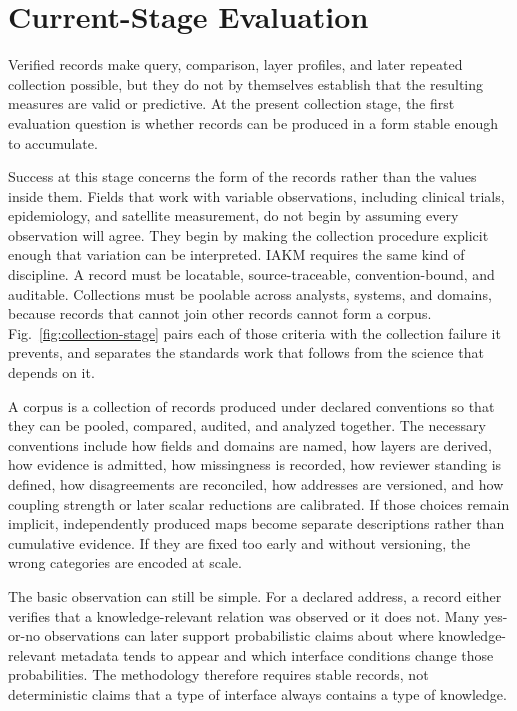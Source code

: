 \documentclass[conference]{IEEEtran}
\begin{document}
\section{Current-Stage Evaluation}\label{sec:9}

Verified records make query, comparison, layer profiles, and later repeated collection possible, but they do not by themselves establish that the resulting measures are valid or predictive. At the present collection stage, the first evaluation question is whether records can be produced in a form stable enough to accumulate.

Success at this stage concerns the form of the records rather than the values inside them. Fields that work with variable observations, including clinical trials, epidemiology, and satellite measurement, do not begin by assuming every observation will agree. They begin by making the collection procedure explicit enough that variation can be interpreted. IAKM requires the same kind of discipline. A record must be locatable, source-traceable, convention-bound, and auditable. Collections must be poolable across analysts, systems, and domains, because records that cannot join other records cannot form a corpus. Fig.~\ref{fig:collection-stage} pairs each of those criteria with the collection failure it prevents, and separates the standards work that follows from the science that depends on it.

A corpus is a collection of records produced under declared conventions so that they can be pooled, compared, audited, and analyzed together. The necessary conventions include how fields and domains are named, how layers are derived, how evidence is admitted, how missingness is recorded, how reviewer standing is defined, how disagreements are reconciled, how addresses are versioned, and how coupling strength or later scalar reductions are calibrated. If those choices remain implicit, independently produced maps become separate descriptions rather than cumulative evidence. If they are fixed too early and without versioning, the wrong categories are encoded at scale.

The basic observation can still be simple. For a declared address, a record either verifies that a knowledge-relevant relation was observed or it does not. Many yes-or-no observations can later support probabilistic claims about where knowledge-relevant metadata tends to appear and which interface conditions change those probabilities. The methodology therefore requires stable records, not deterministic claims that a type of interface always contains a type of knowledge.
\end{document}
